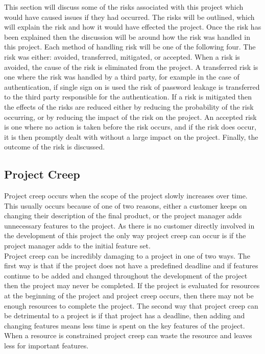 \documentclass{article}
\begin{document}
This section will discuss some of the risks associated with this project which would have caused issues if they had occurred. The risks will be outlined, which will explain the risk and how it would have effected the project. Once the risk has been explained then the discussion will be around how the risk was handled in this project. Each method of handling risk will be one of the following four. The risk was either: avoided, transferred, mitigated, or accepted. When a risk is avoided, the cause of the risk is eliminated from the project. A transferred risk is one where the risk was handled by a third party, for example in the case of authentication, if single sign on is used the risk of password leakage is transferred to the third party responsible for the authentication. If a risk is mitigated then the effects of the risks are reduced either by reducing the probability of the risk occurring, or by reducing the impact of the risk on the project. An accepted risk is one where no action is taken before the risk occurs, and if the risk does occur, it is then promptly dealt with without a large impact on the project. Finally, the outcome of the risk is discussed. \\

\subsection{Project Creep}

Project creep occurs when the scope of the project slowly increases over time. This usually occurs because of one of two reasons, either a customer keeps on changing their description of the final product, or the project manager adds unnecessary features to the project. As there is no customer directly involved in the development of this project the only way project creep can occur is if the project manager adds to the initial feature set. \\

Project creep can be incredibly damaging to a project in one of two ways. The first way is that if the project does not have a predefined deadline and if features continue to be added and changed throughout the development of the project then the project may never be completed. If the project is evaluated for resources at the beginning of the project and project creep occurs, then there may not be enough resources to complete the project. The second way that project creep can be detrimental to a project is if that project has a deadline, then adding and changing features means less time is spent on the key features of the project. When a resource is constrained project creep can waste the resource and leaves less for important features. \\
\end{document}
